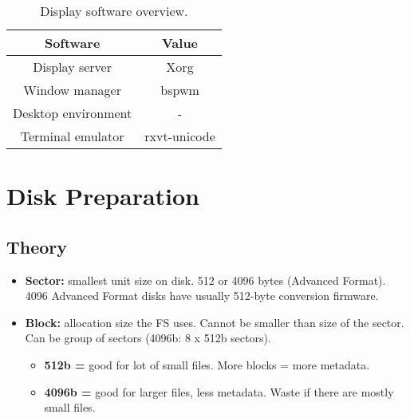 \documentclass[10pt, a4paper, onecolumn, oneside, titlepage, openany]{book}
\begin{document}
\begin{table}[!ht]
\centering
\begin{tabular}{|c|c|}
    \hline
    \textbf{Software} & \textbf{Value} \\
    \hline
    Display server & Xorg\\
    Window manager & bspwm\\
    Desktop environment & -\\
    Terminal emulator & rxvt-unicode\\
    \hline
\end{tabular}
\caption{Display software overview.}
\label{table:3}
\end{table}


\chapter{Disk Preparation}
\section{Theory}
\begin{itemize}
    \item \textbf{Sector:} smallest unit size on disk. 512 or 4096 bytes (Advanced Format). 4096 Advanced Format disks have usually 512-byte conversion firmware.
    \item \textbf{Block:} allocation size the FS uses. Cannot be smaller than size of the sector. Can be group of sectors (4096b: 8 x 512b sectors).
    \begin{itemize}
        \item \textbf{512b =} good for lot of small files. More blocks = more metadata.
        \item \textbf{4096b =}  good for larger files, less metadata. Waste if there are mostly small files.
    \end{itemize}
\end{itemize}
\end{document}

